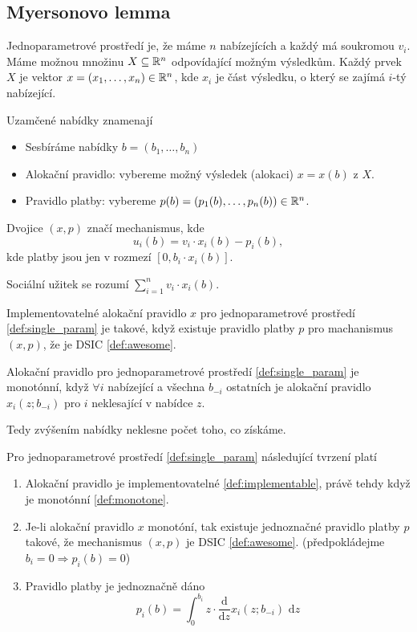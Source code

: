 \subsection{Myersonovo lemma}
\begin{definition}\label{def:single_param}
  Jednoparametrové prostředí je, že máme $n$ nabízejících a každý má soukromou $v_i$. 
  Máme možnou množinu $X \subseteq \mathbb{R}^n$ odpovídající možným výsledkům. 
  Každý prvek $X$ je vektor $x = (x_1,\dots,x_n) \in \mathbb{R}^n$, kde $x_i$ je část výsledku, o který se zajímá $i$-tý nabízející. 

  Uzamčené nabídky znamenají
  \begin{itemize}
    \item Sesbíráme nabídky $b = (b_1,\dots,b_n)$
    \item Alokační pravidlo: vybereme možný výsledek (alokaci) $x =x(b)$ z $X$. 
    \item Pravidlo platby: vybereme $p(b)= (p_1(b), \dots,p_n(b)) \in \mathbb{R}^n$. 
  \end{itemize}

  Dvojice $(x,p)$ značí mechanismus, kde 
  \[
    u_i(b) = v_i \cdot x_i(b) - p_i(b), 
  \]
  kde platby jsou jen v rozmezí $[0,b_i \cdot x_i(b)]$.

  Sociální užitek se rozumí $\sum^n_{i=1} v_i \cdot x_i(b)$.
\end{definition}

\begin{definition}\label{def:implementable}
    Implementovatelné alokační pravidlo $x$ pro jednoparametrové prostředí \ref{def:single_param} je takové, když existuje pravidlo platby $p$ pro machanismus $(x,p)$, že je DSIC \ref{def:awesome}.
\end{definition}

\begin{definition}\label{def:monotone}
    Alokační pravidlo pro jednoparametrové prostředí \ref{def:single_param} je monotónní, když $\forall i$ nabízející a všechna $b_{-i}$ ostatních je alokační pravidlo $x_i(z;b_{-i})$ pro $i$ neklesající v nabídce $z$. 
\end{definition}
Tedy zvýšením nabídky neklesne počet toho, co získáme. 

\begin{theorem}\label{thm:myerson}
    Pro jednoparametrové prostředí \ref{def:single_param} následující tvrzení platí 
    \begin{enumerate}
        \item Alokační pravidlo je implementovatelné \ref{def:implementable}, právě tehdy když je monotónní \ref{def:monotone}. 
        \item Je-li alokační pravidlo $x$ monotóní, tak existuje jednoznačné pravidlo platby $p$ takové, že mechanismus $(x,p)$ je DSIC \ref{def:awesome}. (předpokládejme $b_i = 0 \Rightarrow p_i(b)=0$)
        \item Pravidlo platby je jednoznačně dáno 
            \[
                p_i(b) = \int_0^{b_i} z\cdot \frac{\text{d}}{\text{d}z} x_i(z;b_{-i}) \text{ d}z
            \]
    \end{enumerate}
\end{theorem}

